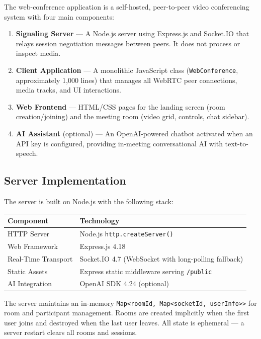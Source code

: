 \documentclass[11pt,letterpaper]{article}
\begin{document}
The web-conference application is a self-hosted, peer-to-peer video conferencing system with four main components:

\begin{enumerate}[leftmargin=2em]
    \item \textbf{Signaling Server} --- A Node.js server using Express.js and Socket.IO that relays session negotiation messages between peers. It does not process or inspect media.
    \item \textbf{Client Application} --- A monolithic JavaScript class (\texttt{WebConference}, approximately 1,000 lines) that manages all WebRTC peer connections, media tracks, and UI interactions.
    \item \textbf{Web Frontend} --- HTML/CSS pages for the landing screen (room creation/joining) and the meeting room (video grid, controls, chat sidebar).
    \item \textbf{AI Assistant} (optional) --- An OpenAI-powered chatbot activated when an API key is configured, providing in-meeting conversational AI with text-to-speech.
\end{enumerate}

\subsection{Server Implementation}

The server is built on Node.js with the following stack:

\begin{center}
\begin{tabular}{ll}
\toprule
\textbf{Component} & \textbf{Technology} \\
\midrule
HTTP Server & Node.js \texttt{http.createServer()} \\
Web Framework & Express.js 4.18 \\
Real-Time Transport & Socket.IO 4.7 (WebSocket with long-polling fallback) \\
Static Assets & Express static middleware serving \texttt{/public} \\
AI Integration & OpenAI SDK 4.24 (optional) \\
\bottomrule
\end{tabular}
\end{center}

The server maintains an in-memory \texttt{Map<roomId, Map<socketId, userInfo>>} for room and participant management. Rooms are created implicitly when the first user joins and destroyed when the last user leaves. All state is ephemeral --- a server restart clears all rooms and sessions.
\end{document}
